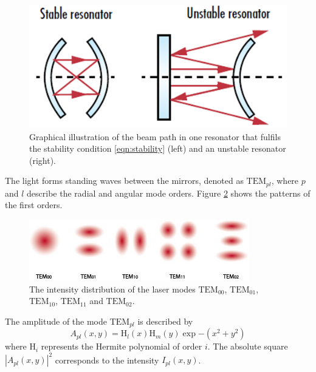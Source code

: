\begin{figure}[H]
    \centering
    \includegraphics[scale=0.5]{pictures/resonator.png} %
    \caption{Graphical illustration of the beam path in one resonator that fulfils the stability condition \eqref{eqn:stability} (left) and an unstable resonator (right). \cite{resonator}}
    \label{fig:resonator}
\end{figure}

\noindent
The light forms standing waves between the mirrors, denoted as $\text{TEM}_{pl}$,
where $p$ and $l$ describe the radial and angular mode orders. Figure 
\ref{fig:TEM} shows the patterns of the first orders.

\begin{figure}[H]
    \centering
    \includegraphics[scale=0.8]{pictures/modes2.jpg} %
    \caption{The intensity distribution of the laser modes $\text{TEM}_{00}$, $\text{TEM}_{01}$, $\text{TEM}_{10}$, $\text{TEM}_{11}$ and $\text{TEM}_{02}$. \cite{TEM2}}
    \label{fig:TEM}
\end{figure}

\noindent
The amplitude of the mode $\text{TEM}_{pl}$ is described by 
\begin{equation}
    A_{pl}(x,y)=\text{H}_l(x)\text{H}_m(y)\exp{-(x^2+y^2)}
    \label{eqn:TEM}
\end{equation}
where $\text{H}_i$ represents the Hermite polynomial of order $i$. 
The absolute square $|A_{pl}(x,y)|^2$ corresponds to the intensity
$I_{pl}(x,y)$.
